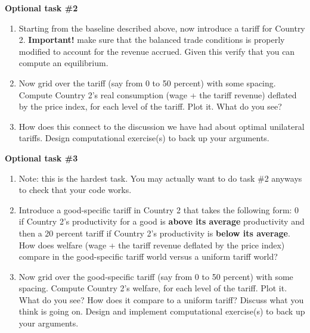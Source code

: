 \documentclass[pdftex,11pt]{article}
\begin{document}
\bigskip
\bigskip

\centerline{ \large \textbf{Optional task \#2}}
\begin{enumerate}
\item Starting from the baseline described above, now introduce a tariff for Country 2. \textbf{Important!} make sure that the balanced trade conditions is properly modified to account for the revenue accrued. Given this verify that you can compute an equilibrium. 

\item Now grid over the tariff (say from 0 to 50 percent) with some spacing. Compute Country 2's real consumption (wage + the tariff revenue) deflated by the price index, for each level of the tariff. Plot it. What do you see?

\item How does this connect to the discussion we have had about optimal unilateral tariffs. Design computational exercise(s) to back up your arguments.
\end{enumerate}

\bigskip
\bigskip

\newpage

\centerline{ \large \textbf{Optional task \#3}}
\begin{enumerate}
\item Note: this is the hardest task. You may actually want to do task \#2 anyways to check that your code works. 

\item Introduce a good-specific tariff in Country 2 that takes the following form: 0 if Country 2's productivity for a good is \textbf{above its average} productivity and then a 20 percent tariff if Country 2's productivity is \textbf{below its average}. How does welfare (wage + the tariff revenue deflated by the price index) compare in the good-specific tariff world versus a uniform tariff world?
    
\item Now grid over the good-specific tariff (say from 0 to 50 percent) with some spacing. Compute Country 2's welfare, for each level of the tariff. Plot it. What do you see? How does it compare to a uniform tariff? Discuss what you think is going on. Design and implement computational exercise(s) to back up your arguments.
\end{enumerate}
\end{document}
